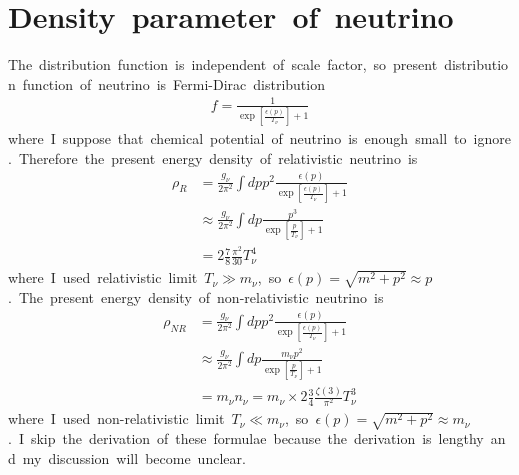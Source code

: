 \section{Density\ parameter\ of\ neutrino}
The\ distribution\ function\ is\ independent\ of\ scale\ factor,\ so\ present\ distribution\ function\ of\ neutrino\ is\ Fermi-Dirac\ distribution
\begin{align*}
    f=\frac{1}{\exp\left[\frac{\epsilon(p)}{T_{\nu}}\right]+1}
\end{align*}
where\ I\ suppose\ that\ chemical\ potential\ of\ neutrino\ is\ enough\ small\ to\ ignore.\ Therefore\ the\ present\ energy\ density\ of\ relativistic\ neutrino\ is\
\begin{align*}
    \rho_R&=\frac{g_{\nu}}{2\pi^2}\int dpp^2\frac{\epsilon(p)}{\exp\left[\frac{\epsilon(p)}{T_{\nu}}\right]+1}\\
    &\approx\frac{g_{\nu}}{2\pi^2}\int dp\frac{p^3}{\exp\left[\frac{p}{T_{\nu}}\right]+1}\\
    &=2\frac{7}{8}\frac{\pi^2}{30}T^4_{\nu}
\end{align*}
where\ I\ used\ relativistic\ limit\ $T_{\nu}\gg m_{\nu}$,\ so\ $\epsilon(p)=\sqrt{m^2+p^2}\approx p$.\ The\ present\ energy\ density\ of\ non-relativistic\ neutrino\ is
\begin{align*}
    \rho_{NR}&=\frac{g_{\nu}}{2\pi^2}\int dpp^2\frac{\epsilon(p)}{\exp\left[\frac{\epsilon(p)}{T_{\nu}}\right]+1}\\
    &\approx\frac{g_{\nu}}{2\pi^2}\int dp\frac{m_{\nu}p^2}{\exp\left[\frac{p}{T_{\nu}}\right]+1}\\
    &=m_{\nu}n_{\nu}=m_{\nu}\times2\frac{3}{4}\frac{\zeta(3)}{\pi^2}T^3_{\nu}
\end{align*}
where\ I\ used\ non-relativistic\ limit\ $T_{\nu}\ll m_{\nu}$,\ so\ $\epsilon(p)=\sqrt{m^2+p^2}\approx m_{\nu}$.\ I\ skip\ the\ derivation\ of\ these\ formulae\ because\ the\ derivation\ is\ lengthy\ and\ my\ discussion\ will\ become\ unclear.

